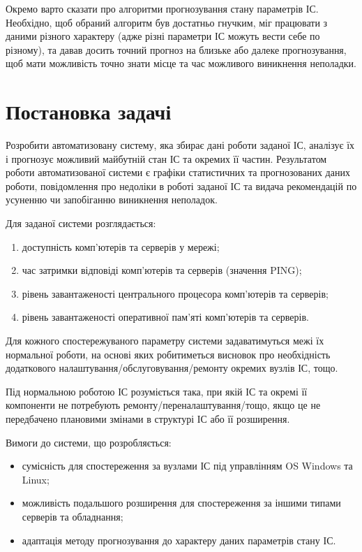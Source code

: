 \documentclass{thesis_utf8}
\begin{document}
Окремо варто сказати про алгоритми прогнозування стану параметрів ІС. Необхідно, щоб обраний алгоритм був достатньо
гнучким, міг працювати з даними різного характеру (адже різні параметри ІС можуть вести себе по різному), та давав
досить точний прогноз на близьке або далеке прогнозування, щоб мати можливість точно знати місце та час можливого
виникнення неполадки.

\chapter{Постановка задачі}
\label{chapter:zadacha}

Розробити автоматизовану систему, яка збирає дані роботи заданої ІС, аналізує їх і прогнозує можливий майбутній стан ІС та окремих її частин. Результатом роботи автоматизованої системи є графіки статистичних та прогнозованих даних роботи, повідомлення про недоліки в роботі заданої ІС та видача рекомендацій по усуненню чи запобіганню виникнення неполадок.

Для заданої системи розглядається:
\begin{enumerate}
    \item доступність комп'ютерів та серверів у мережі;
    \item	час затримки відповіді комп'ютерів та серверів (значення PING);
    \item	рівень завантаженості центрального процесора комп'ютерів та серверів;
    \item	рівень завантаженості оперативної пам'яті комп'ютерів та серверів.
\end{enumerate}
%

Для кожного спостережуваного параметру системи задаватимуться межі їх нормальної роботи, на основі яких робитиметься висновок про необхідність додаткового налаштування/обслуговування/ремонту окремих вузлів ІС, тощо.

Під нормальною роботою ІС розуміється така, при якій ІС та окремі її компоненти не потребують ремонту/переналаштування/тощо, якщо це не передбачено плановими змінами в структурі ІС або її розширення.

Вимоги до системи, що розробляється:
\begin{itemize}
    \item сумісність для спостереження за вузлами ІС під управлінням OS Windows та Linux;
    \item можливість подальшого розширення для спостереження за іншими типами серверів та обладнання;
    \item адаптація методу прогнозування до характеру даних параметрів стану ІС.
\end{itemize}
\end{document}
